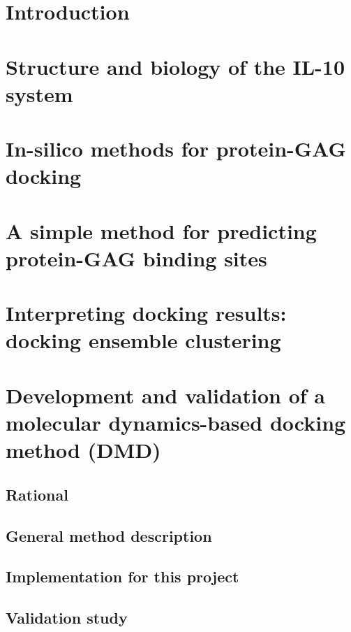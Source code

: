 





\frontmatter


\pagestyle{Ruled}
\tableofcontents*


\mainmatter
\chapter{Introduction}
\lipsum[1-10]

\chapter{Structure and biology of the IL-10 system}
\lipsum[1-10]

\chapter{In-silico methods for protein-GAG docking}
\lipsum[1-10]

\chapter{A simple method for predicting protein-GAG binding sites}
\lipsum[1-10]

\chapter{Interpreting docking results: docking ensemble clustering}
\lipsum[1-10]


\chapter{Development and validation of a molecular dynamics-based docking method (DMD)}
\section{Rational}
\lipsum[1-5]
\section{General method description}
\lipsum[1-5]
\section{Implementation for this project}
\lipsum[1-5]
\section{Validation study}
\lipsum[1-5]


